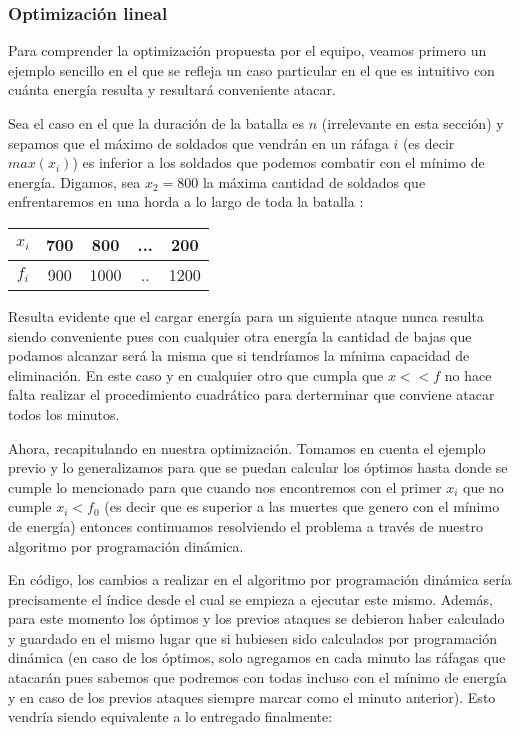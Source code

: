 \subsubsection{Optimización lineal} Para comprender la optimización propuesta por el equipo, veamos primero un ejemplo sencillo en el que se refleja un caso particular en el que es intuitivo con cuánta energía resulta y resultará conveniente atacar. 

Sea el caso en el que la duración de la batalla es $n$ (irrelevante en esta sección) y sepamos que el máximo de soldados que vendrán en un ráfaga $i$ (es decir $max(x_i)$) es inferior a los soldados que podemos combatir con el mínimo de energía. Digamos, sea $x_2  = 800$ la máxima cantidad de soldados que enfrentaremos en una horda a lo largo de toda la batalla :

\begin{center}
\begin{tabular}{ |c|c|c|c|c| }
\hline
\textbf{$x_i$} & 700 & 800& ... & 200 \\ \hline
\textbf{$f_i$} & 900 & 1000&.. & 1200 \\
\hline
\end{tabular}
\end{center}
Resulta evidente que el cargar energía para un siguiente ataque nunca resulta siendo conveniente pues con cualquier otra energía la cantidad de bajas que podamos alcanzar será la misma que si tendríamos la mínima capacidad de eliminación. En este caso y en cualquier otro que cumpla que $x<<f$ no hace falta realizar el procedimiento cuadrático para derterminar que conviene atacar todos los minutos.

Ahora, recapitulando en nuestra optimización. Tomamos en cuenta el ejemplo previo y lo generalizamos para que se puedan calcular los óptimos hasta donde se cumple lo mencionado para que cuando nos encontremos con el primer $x_i$ que no cumple $x_i<f_0$ (es decir que es superior a las muertes que genero con el mínimo de energía) entonces continuamos resolviendo el problema a través de nuestro algoritmo por programación dinámica.

En código, los cambios a realizar en el algoritmo por programación dinámica sería precisamente el índice desde el cual se empieza a ejecutar este mismo. Además, para este momento los óptimos y los previos ataques se debieron haber calculado y guardado en el mismo lugar que si hubiesen sido calculados por programación dinámica (en caso de los óptimos, solo agregamos  en cada minuto las ráfagas que atacarán pues sabemos que podremos con todas incluso con el mínimo de energía y en caso de los previos ataques siempre marcar como el minuto anterior). Esto vendría siendo equivalente a lo entregado finalmente:

